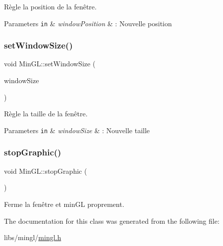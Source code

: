 Règle la position de la fenêtre. 


\begin{DoxyParams}[1]{Parameters}
\mbox{\tt in}  & {\em window\+Position} & \+: Nouvelle position \\
\hline
\end{DoxyParams}
\mbox{\label{class_min_g_l_a532d320b7b837998533fe6577ab45bc3}} 
\subsubsection{\texorpdfstring{set\+Window\+Size()}{setWindowSize()}}
{\footnotesize\ttfamily void Min\+G\+L\+::set\+Window\+Size (\begin{DoxyParamCaption}\item[{const \hyperlink{classns_graphics_1_1_vec2_d}{ns\+Graphics\+::\+Vec2D} \&}]{window\+Size }\end{DoxyParamCaption})}



Règle la taille de la fenêtre. 


\begin{DoxyParams}[1]{Parameters}
\mbox{\tt in}  & {\em window\+Size} & \+: Nouvelle taille \\
\hline
\end{DoxyParams}
\mbox{\label{class_min_g_l_a9508f3ac9d4cb4f444f56f5d77ed9d86}} 
\subsubsection{\texorpdfstring{stop\+Graphic()}{stopGraphic()}}
{\footnotesize\ttfamily void Min\+G\+L\+::stop\+Graphic (\begin{DoxyParamCaption}{ }\end{DoxyParamCaption})}



Ferme la fenêtre et min\+GL proprement. 



The documentation for this class was generated from the following file\+:\begin{DoxyCompactItemize}
\item 
libs/mingl/\hyperlink{mingl_8h}{mingl.\+h}\end{DoxyCompactItemize}

